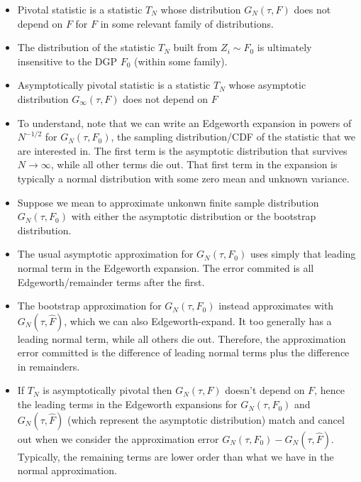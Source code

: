 \documentclass[12pt]{article}
\theoremstyle{plain}
\theoremstyle{definition}
\theoremstyle{remark}
\newcommand{\ra}{\rightarrow}
\begin{document}
\begin{itemize}
  \item Pivotal statistic is a statistic $T_N$ whose distribution
    $G_N(\tau,F)$ does not depend on $F$ for $F$ in some relevant family
    of distributions.
  \item The distribution of the statistic $T_N$ built from $Z_i\sim F_0$
    is ultimately insensitive to the DGP $F_0$ (within some family).
  \item Asymptotically pivotal statistic is a statistic $T_N$ whose
    asymptotic distribution $G_\infty(\tau,F)$ does not depend on $F$
  \item To understand, note that we can write an Edgeworth expansion in
    powers of $N^{-1/2}$ for $G_N(\tau,F_0)$,
    the sampling distribution/CDF of the statistic that we are
    interested in.
    The first term is the asymptotic distribution that survives
    $N\ra\infty$, while all other terms die out.
    That first term in the expansion is typically a normal distribution
    with some zero mean and unknown variance.

  \item Suppose we mean to approximate unkonwn finite sample distribution
    $G_N(\tau,F_0)$ with either the asymptotic distribution or the
    bootstrap distribution.

  \item The usual asymptotic approximation for $G_N(\tau,F_0)$ uses
    simply that leading normal term in the Edgeworth expansion.
    The error commited is all Edgeworth/remainder terms after the first.

  \item The bootstrap approximation for $G_N(\tau,F_0)$ instead
    approximates with $G_N(\tau,\hat{F})$, which we can also
    Edgeworth-expand.
    It too generally has a leading normal term, while all others die
    out.
    Therefore, the approximation error committed is the difference of
    leading normal terms plus the difference in remainders.

  \item If $T_N$ is asymptotically pivotal then $G_N(\tau,F)$ doesn't
    depend on $F$, hence the leading terms in the Edgeworth expansions
    for $G_N(\tau,F_0)$ and $G_N(\tau,\hat{F})$ (which represent the
    asymptotic distribution) match and cancel out when we consider the
    approximation error $G_N(\tau,F_0)-G_N(\tau,\hat{F})$.
    Typically, the remaining terms are lower order than what we have in
    the normal approximation.
\end{itemize}
\end{document}
